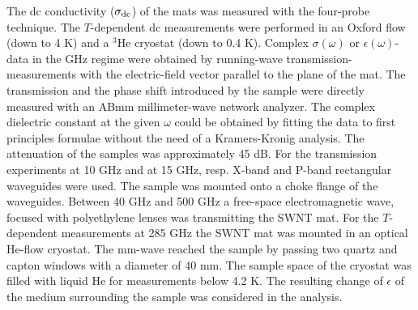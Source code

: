 \begin{multicols}{2}
The dc conductivity ($\sigma_{\rm dc}$) of the mats was measured with the
four-probe technique. The $T$-dependent dc measurements were performed
in an Oxford flow (down to 4 K) and a $^3$He cryostat (down to 0.4
K). Complex $\sigma(\omega)$ or $\epsilon(\omega)$-data in the GHz
regime were obtained by running-wave transmission-measurements with the
electric-field vector parallel to the plane of the mat. The transmission and
the phase shift introduced by the sample were directly measured with an ABmm
millimeter-wave network analyzer.  The complex dielectric constant at the
given $\omega$ could be obtained by fitting the data to first principles
formulae\cite{Reedijk99} without the need of a Kramers-Kronig analysis.  The
attenuation of the samples was approximately 45 dB. For the transmission
experiments at 10 GHz and at 15 GHz, resp.  X-band and P-band rectangular
waveguides were used.  The sample was mounted onto a choke flange of the
waveguides.  Between 40 GHz and 500 GHz a free-space electromagnetic wave,
focused with polyethylene lenses was transmitting the SWNT mat. For the
$T$-dependent measurements at 285 GHz the SWNT mat was mounted in an optical
He-flow cryostat. The mm-wave reached the sample by passing two quartz and
capton windows with a diameter of
40 mm. The sample space of the cryostat was filled with liquid He
for measurements below 4.2 K. The resulting change of $\epsilon$ of the
medium surrounding the sample was considered in the analysis.\\



\end{multicols}
